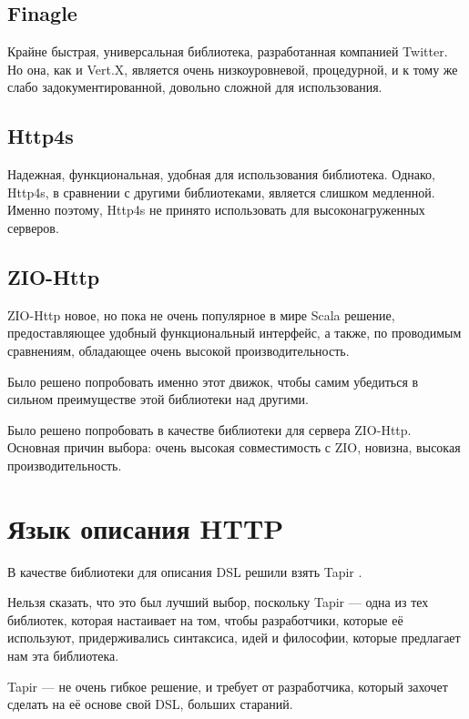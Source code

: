 \documentclass[14pt]{extarticle}
\begin{document}
    \subsection{Finagle}
    Крайне быстрая, универсальная библиотека, разработанная компанией Twitter. Но она, как и Vert.X, является очень
    низкоуровневой, процедурной, и к тому же слабо задокументированной, довольно сложной для использования.
    
    \subsection{Http4s}
    Надежная, функциональная, удобная для использования библиотека. Однако, Http4s, в сравнении с другими библиотеками,
    является слишком медленной. Именно поэтому, Http4s не принято использовать для высоконагруженных серверов.
    
    \subsection{ZIO-Http}

    ZIO-Http новое, но пока не очень популярное в мире Scala решение,
    предоставляющее удобный
    функциональный
    интерфейс, а
    также, по проводимым сравнениям, обладающее очень высокой производительность.

    Было решено попробовать именно этот движок, чтобы самим убедиться в сильном преимуществе этой библиотеки над
    другими.

    Было решено попробовать в качестве библиотеки для сервера ZIO-Http. Основная причин выбора: очень высокая
    совместимость с ZIO, новизна, высокая производительность.


    \section{Язык описания HTTP}

    В качестве библиотеки для описания DSL решили взять Tapir \cite{tapir}.

    Нельзя сказать, что это был лучший выбор, поскольку Tapir --- одна из тех библиотек, которая настаивает на том,
    чтобы разработчики, которые её используют, придерживались синтаксиса, идей и философии, которые предлагает нам
    эта библиотека.

    Tapir --- не очень гибкое решение, и требует от разработчика, который захочет сделать на её основе свой DSL, больших
    стараний.
\end{document}
